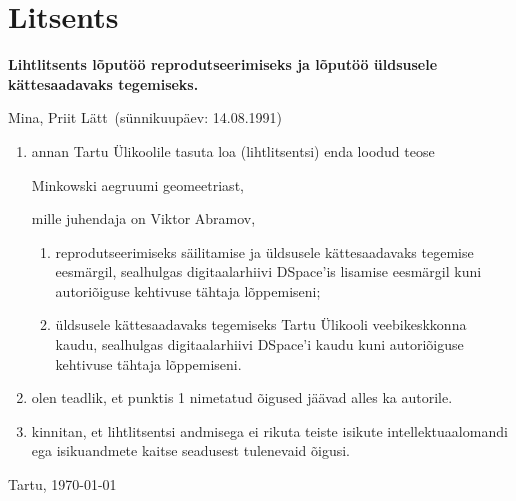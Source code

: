 \documentclass[12pt,a4paper,oneside]{article}
\theoremstyle{plain}
\theoremstyle{definition}
\numberwithin{equation}{section}
\def\title{Minkowski aegruumi geomeetriast}
\def\author{Priit Lätt}
\begin{document}
\newpage
\section*{Litsents}

\textbf{Lihtlitsents lõputöö reprodutseerimiseks ja 
	lõputöö üldsusele kätte\-saadavaks tegemiseks.}


Mina, \author\ (sünnikuupäev: 14.08.1991)
\begin{enumerate}
	\item annan Tartu Ülikoolile tasuta loa (lihtlitsentsi) 
	enda loodud teose
	\begin{center}
	\title,
	\end{center}
	mille juhendaja on Viktor Abramov,
	\begin{enumerate}
		\item reprodutseerimiseks säilitamise ja üldsusele 
		kättesaadavaks tegemise eesmärgil, sealhulgas 
		digitaalarhiivi DSpace'is lisamise eesmärgil kuni 
		autoriõiguse kehtivuse tähtaja lõppemiseni;
		\item üldsusele kättesaadavaks tegemiseks Tartu Ülikooli 
		veebikeskkonna kaudu, sealhulgas digitaalarhiivi 
		DSpace'i kaudu kuni autoriõiguse kehtivuse tähtaja lõppemiseni.
	\end{enumerate}
	\item olen teadlik, et punktis 1 nimetatud õigused jäävad 
	alles ka autorile.
	\item kinnitan, et lihtlitsentsi andmisega ei rikuta teiste 
	isikute intellektuaalomandi ega isikuandmete kaitse 
	seadusest tulenevaid õigusi.
\end{enumerate}

\vfill

\begin{center}
Tartu, \ddmmyyyydate \today
\end{center}

\newpage
%


\end{document}
